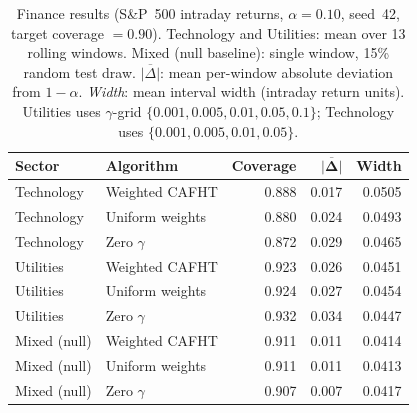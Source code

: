 \begin{table}[ht]
\centering
\small
\setlength{\tabcolsep}{8pt}
\renewcommand{\arraystretch}{1.15}
\caption{%
  Finance results (S\&P~500 intraday returns, $\alpha=0.10$, seed~42, target
  coverage $= 0.90$).
  Technology and Utilities: mean over 13 rolling windows.
  Mixed (null baseline): single window, 15\% random test draw.
  $\overline{|\Delta|}$: mean per-window absolute deviation from $1-\alpha$.
  \textit{Width}: mean interval width (intraday return units).
  Utilities uses $\gamma$-grid $\{0.001, 0.005, 0.01, 0.05, 0.1\}$;
  Technology uses $\{0.001, 0.005, 0.01, 0.05\}$.
}
\label{tab:finance}
\begin{tabular}{@{} llrrr @{}}
\toprule
{\bfseries Sector} & {\bfseries Algorithm}
  & {\bfseries Coverage} & $\boldsymbol{\overline{|\Delta|}}$ & {\bfseries Width} \\
\midrule
Technology
  & Weighted CAFHT      & 0.888 & 0.017 & 0.0505 \\
Technology
  & Uniform weights     & 0.880 & 0.024 & 0.0493 \\
Technology
  & Zero $\gamma$       & 0.872 & 0.029 & 0.0465 \\
\midrule
Utilities
  & Weighted CAFHT      & 0.923 & 0.026 & 0.0451 \\
Utilities
  & Uniform weights     & 0.924 & 0.027 & 0.0454 \\
Utilities
  & Zero $\gamma$       & 0.932 & 0.034 & 0.0447 \\
\midrule
Mixed (null)
  & Weighted CAFHT      & 0.911 & 0.011 & 0.0414 \\
Mixed (null)
  & Uniform weights     & 0.911 & 0.011 & 0.0413 \\
Mixed (null)
  & Zero $\gamma$       & 0.907 & 0.007 & 0.0417 \\
\bottomrule
\end{tabular}
\end{table}




